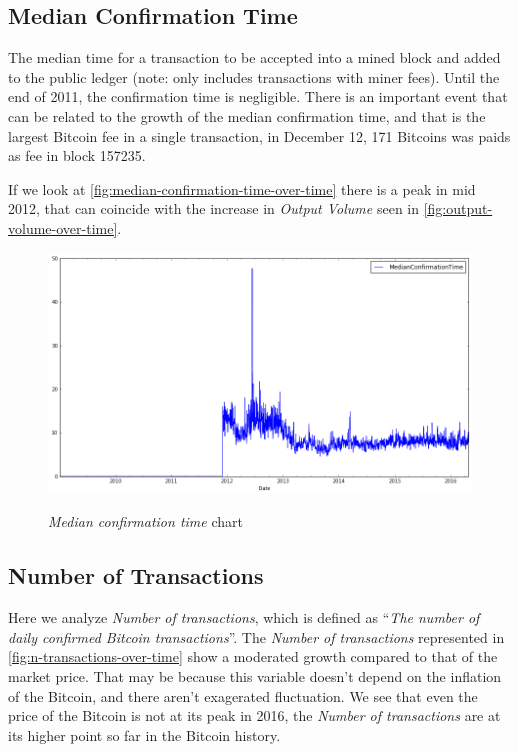 
\subsection{Median Confirmation Time}
\label{sec:median-confirmation-time}

The median time for a transaction to be accepted into a mined block
and added to the public ledger (note: only includes transactions with
miner fees). Until the end of 2011, the confirmation time is
negligible. There is an important event that can be related to the
growth of the median confirmation time, and that is the largest
Bitcoin fee in a single transaction, in December 12, 171 Bitcoins was
paids as fee in block 157235.

If we look at \autoref{fig:median-confirmation-time-over-time} there
is a peak in mid 2012, that can coincide with the increase in
\textit{Output Volume} seen in \autoref{fig:output-volume-over-time}.

\begin{figure}[bth]
  \myfloatalign
  {\includegraphics[width=1\linewidth]
    {gfx/median-confirmation-time-over-time}}
  \caption{\textit{Median confirmation time} chart}
  \label{fig:median-confirmation-time-over-time}
\end{figure}


\subsection{Number of Transactions}
\label{sec:n-transactions-multiple}

Here we analyze \textit{Number of transactions}, which is defined as
``\textit{The number of daily confirmed Bitcoin transactions}''. The
\textit{Number of transactions} represented in
\autoref{fig:n-transactions-over-time} show a moderated
growth compared to that of the market price. That may be because this
variable doesn't depend on the inflation of the Bitcoin, and there
aren't exagerated fluctuation. We see that even the price of the
Bitcoin is not at its peak in 2016, the \textit{Number of
  transactions} are at its higher point so far in the Bitcoin history.

